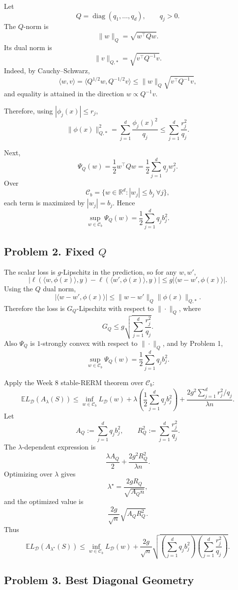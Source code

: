 \documentclass{article}
\DeclareMathOperator{\diag}{diag}
\newcommand{\EE}{\mathbb{E}}
\newcommand{\cC}{\mathcal{C}}
\newcommand{\cD}{\mathcal{D}}
\begin{document}
Let
$$
Q=\diag(q_1,\dots,q_d),
\qquad
q_j>0.
$$
The $Q$-norm is
$$
\|w\|_Q=\sqrt{w^\top Qw}.
$$
Its dual norm is
$$
\|v\|_{Q,*}
=
\sqrt{v^\top Q^{-1}v}.
$$
Indeed, by Cauchy--Schwarz,
$$
\langle w,v\rangle
=
\langle Q^{1/2}w,Q^{-1/2}v\rangle
\le
\|w\|_Q\sqrt{v^\top Q^{-1}v},
$$
and equality is attained in the direction $w\propto Q^{-1}v$.

Therefore, using $|\phi_j(x)|\le r_j$,
$$
\|\phi(x)\|_{Q,*}^2
=
\sum_{j=1}^d \frac{\phi_j(x)^2}{q_j}
\le
\sum_{j=1}^d \frac{r_j^2}{q_j}.
$$

Next,
$$
\Psi_Q(w)
=
\frac12 w^\top Qw
=
\frac12\sum_{j=1}^d q_j w_j^2.
$$
Over
$$
\cC_b=\{w\in\mathbb{R}^d: |w_j|\le b_j\ \forall j\},
$$
each term is maximized by $|w_j|=b_j$. Hence
$$
\sup_{w\in\cC_b}\Psi_Q(w)
=
\frac12\sum_{j=1}^d q_j b_j^2.
$$

\subsection{\texorpdfstring{Problem 2. Fixed $Q$}{Problem 2. Fixed Q}}

The scalar loss is $g$-Lipschitz in the prediction, so for any $w,w'$,
$$
|\ell(\langle w,\phi(x)\rangle,y)-\ell(\langle w',\phi(x)\rangle,y)|
\le
g|\langle w-w',\phi(x)\rangle|.
$$
Using the $Q$ dual norm,
$$
|\langle w-w',\phi(x)\rangle|
\le
\|w-w'\|_Q \|\phi(x)\|_{Q,*}.
$$
Therefore the loss is $G_Q$-Lipschitz with respect to $\|\cdot\|_Q$, where
$$
G_Q
\le
g\sqrt{\sum_{j=1}^d \frac{r_j^2}{q_j}}.
$$
Also $\Psi_Q$ is $1$-strongly convex with respect to $\|\cdot\|_Q$, and by Problem 1,
$$
\sup_{w\in\cC_b}\Psi_Q(w)
=
\frac12\sum_{j=1}^d q_j b_j^2.
$$

Apply the Week 8 stable-RERM theorem over $\cC_b$:
$$
\EE L_{\cD}(A_\lambda(S))
\le
\inf_{w\in\cC_b} L_{\cD}(w)
+
\lambda\left(\frac12\sum_{j=1}^d q_jb_j^2\right)
+
\frac{2g^2\sum_{j=1}^d r_j^2/q_j}{\lambda n}.
$$
Let
$$
A_Q:=\sum_{j=1}^d q_jb_j^2,
\qquad
R_Q^2:=\sum_{j=1}^d \frac{r_j^2}{q_j}.
$$
The $\lambda$-dependent expression is
$$
\frac{\lambda A_Q}{2}+\frac{2g^2R_Q^2}{\lambda n}.
$$
Optimizing over $\lambda$ gives
$$
\lambda^\star=\frac{2gR_Q}{\sqrt{A_Q n}},
$$
and the optimized value is
$$
\frac{2g}{\sqrt n}\sqrt{A_QR_Q^2}.
$$
Thus
$$
\EE L_{\cD}(A_{\lambda^\star}(S))
\le
\inf_{w\in\cC_b}L_{\cD}(w)
+
\frac{2g}{\sqrt n}
\sqrt{
\left(\sum_{j=1}^d q_jb_j^2\right)
\left(\sum_{j=1}^d \frac{r_j^2}{q_j}\right)
}.
$$

\subsection{Problem 3. Best Diagonal Geometry}
\end{document}
